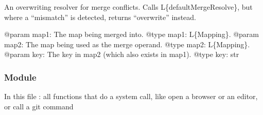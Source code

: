 \documentclass[a4paper,10pt,english]{sphinxmanual}
\begin{document}

\begin{fulllineitems}
\label{\detokenize{commands/apidoc/src:src.pyconf.overwriteMergeResolve}}
An overwriting resolver for merge conflicts. Calls L\{defaultMergeResolve\},
but where a “mismatch” is detected, returns “overwrite” instead.

@param map1: The map being merged into.
@type map1: L\{Mapping\}.
@param map2: The map being used as the merge operand.
@type map2: L\{Mapping\}.
@param key: The key in map2 (which also exists in map1).
@type key: str

\end{fulllineitems}



\subsubsection{ Module}
\label{\detokenize{commands/apidoc/src:system-module}}\label{\detokenize{commands/apidoc/src:module-src.system}}
In this file : all functions that do a system call, 
like open a browser or an editor, or call a git command
\end{document}
